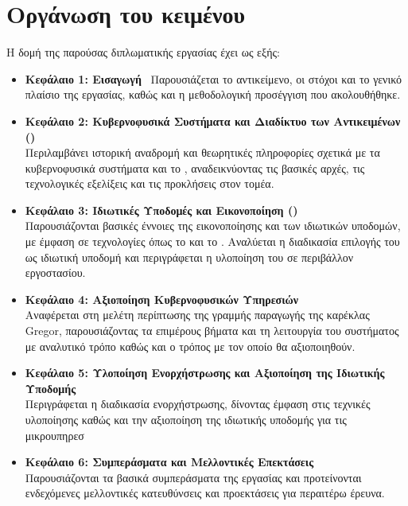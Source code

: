 \section{Οργάνωση του κειμένου}
Η δομή της παρούσας διπλωματικής εργασίας έχει ως εξής:

\begin{itemize}
  \item \textbf{Κεφάλαιο 1: Εισαγωγή} \
    Παρουσιάζεται το αντικείμενο, οι στόχοι και το γενικό πλαίσιο της εργασίας, καθώς και η μεθοδολογική προσέγγιση που ακολουθήθηκε.
  \item \textbf{Κεφάλαιο 2: Κυβερνοφυσικά Συστήματα και Διαδίκτυο των Αντικειμένων ()} \\
    Περιλαμβάνει ιστορική αναδρομή και θεωρητικές πληροφορίες σχετικά με τα κυβερνοφυσικά συστήματα και το \en{IoT}, αναδεικνύοντας τις βασικές αρχές, τις τεχνολογικές εξελίξεις και τις προκλήσεις στον τομέα.

  \item \textbf{Κεφάλαιο 3: Ιδιωτικές Υποδομές και Εικονοποίηση ()} \\
    Παρουσιάζονται βασικές έννοιες της εικονοποίησης και των ιδιωτικών υποδομών, με έμφαση σε τεχνολογίες όπως το  και το . Αναλύεται η διαδικασία επιλογής του  ως ιδιωτική υποδομή και περιγράφεται η υλοποίηση του σε περιβάλλον εργοστασίου.

  \item \textbf{Κεφάλαιο 4: Αξιοποίηση Κυβερνοφυσικών Υπηρεσιών} \\
    Αναφέρεται στη μελέτη περίπτωσης της γραμμής παραγωγής της καρέκλας Gregor, παρουσιάζοντας τα επιμέρους βήματα και τη λειτουργία του συστήματος με αναλυτικό τρόπο καθώς και ο τρόπος με τον οποίο θα αξιοποιηθούν.

  \item \textbf{Κεφάλαιο 5: Υλοποίηση Ενορχήστρωσης και Αξιοποίηση της Ιδιωτικής Υποδομής} \\
    Περιγράφεται η διαδικασία ενορχήστρωσης, δίνοντας έμφαση στις τεχνικές υλοποίησης καθώς και την αξιοποίηση της ιδιωτικής υποδομής για τις μικρουπηρεσ

  \item \textbf{Κεφάλαιο 6: Συμπεράσματα και Μελλοντικές Επεκτάσεις} \\
    Παρουσιάζονται τα βασικά συμπεράσματα της εργασίας και προτείνονται ενδεχόμενες μελλοντικές κατευθύνσεις και προεκτάσεις για περαιτέρω έρευνα.

\end{itemize}